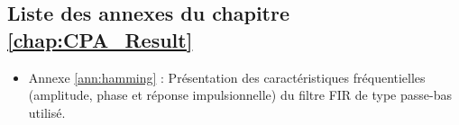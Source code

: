 \documentclass[oneside]{book}
\begin{document}
\begin{appendices}
\newpage






\chapter{Liste des annexes du chapitre \ref{chap:CPA_Result}}
\begin{itemize}
\item Annexe \ref{ann:hamming} : Présentation des caractéristiques fréquentielles (amplitude, phase et réponse impulsionnelle) du filtre FIR de type passe-bas utilisé.
\end{itemize}

\newpage


\end{appendices}
\end{document}
